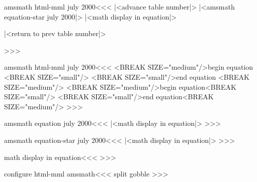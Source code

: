 {\<amsmath html-mml july 2000\><<<
  {\ifvmode \IgnorePar\fi\EndP
   |<advance table number|>%
   |<amsmath equation-star july 2000|>%
   |<math display in equation|>%
  }
  {\ifvmode \IgnorePar\fi\EndP 
   |<return to prev table number|>%
   \ShowPar\IgnoreIndent\par}
>>>


\<amsmath html-mml july 2000\><<<
   {<BREAK SIZE="medium"/>begin equation 
    <BREAK SIZE="small"/>
   }
   {<BREAK SIZE="small"/>end equation 
                     \theequation<BREAK SIZE="medium"/>}
   {<BREAK SIZE="medium"/>begin equation<BREAK SIZE="small"/>}
   {<BREAK SIZE="small"/>end equation<BREAK SIZE="medium"/>}
>>>



\<amsmath equation july 2000\><<<
     {\IgnorePar 
         |<math display in equation|>}
     {}
     {}
     {}
     {\ifnum{} \IgnorePar
         \fi }
     {}
>>>


\<amsmath equation-star july 2000\><<<
     {\IgnorePar 
         |<math display in equation|>}
     {}
     {}
     {}
     {\ifnum{} \IgnorePar
         \fi }
     {}
>>>


\<math display in equation\><<<
\Configure{$$}
   {\IgnorePar\EndP\DviMath}
   {\EndDviMath\EndP}
   {\DisplayMathtrue}%
>>>











\<configure html-mml amsmath\><<<
  {split}
  {\let\tagform@=\:gobble }
>>>





}
